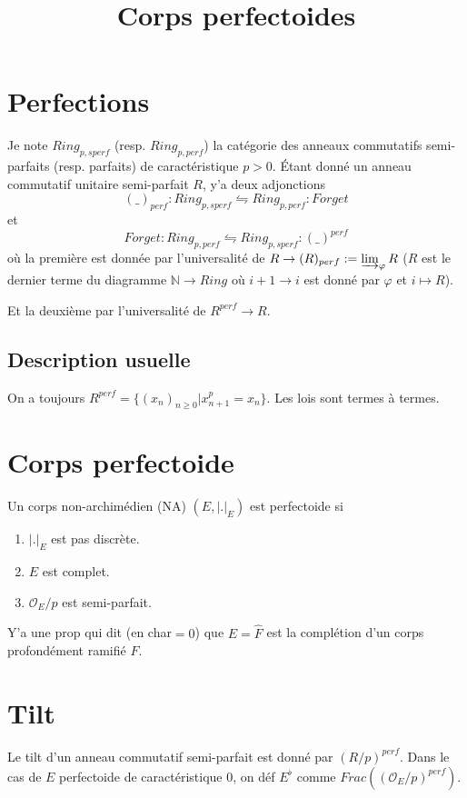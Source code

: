 \documentclass[a4paper,12pt]{article}
\title{Corps perfectoides}
\date{}
\newcommand{\N}{\mathbb{N}}
\newcommand{\Or}{\mathcal{O}}
\theoremstyle{plain}
\theoremstyle{definition}
\theoremstyle{remark}
\begin{document}
\maketitle
\section{Perfections}
Je note $Ring_{p,sperf}$ (resp. $Ring_{p,perf}$) la catégorie des
anneaux commutatifs semi-parfaits (resp. parfaits) de
caractéristique $p>0$. 
Étant donné un anneau commutatif unitaire semi-parfait $R$,
y'a deux adjonctions
\[(\_)_{perf}\colon Ring_{p, sperf}\leftrightharpoons Ring_{p,perf}\colon Forget\]
et
\[Forget\colon Ring_{p, perf}\leftrightharpoons Ring_{p,sperf}\colon (\_)^{perf}\]
où la première est donnée par l'universalité de 
$R\to (R)_{perf}:=\varinjlim_{\varphi}R$
($R$ est le dernier terme du diagramme $\N\to Ring$ où $i+1\to i$
est donné par $\varphi$ et $i\mapsto R$).

Et la deuxième par l'universalité de $R^{perf}\to R$.

\subsection{Description usuelle}
On a toujours $R^{perf}=\{(x_n)_{n\geq 0}| x_{n+1}^p=x_n\}$. 
Les lois sont termes à termes.

\section{Corps perfectoide}
Un corps non-archimédien (NA) $(E,|.|_E)$ est perfectoide si
\begin{enumerate}
    \item $|.|_E$ est pas discrète.
    \item $E$ est complet.
    \item $\Or_E/p$ est semi-parfait.
\end{enumerate}
Y'a une prop qui dit (en char$=0$) que $E=\widehat F$ est la
complétion d'un corps profondément ramifié $F$.

\section{Tilt}
Le tilt d'un anneau commutatif semi-parfait est donné par 
$(R/p)^{perf}$. Dans le cas de $E$ perfectoide de caractéristique 
$0$, on déf $E^\flat$ comme $Frac((\Or_E/p)^{perf})$. 
\end{document}
